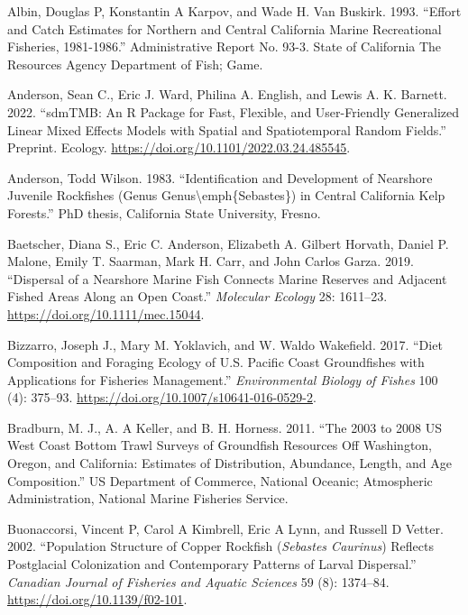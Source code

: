 \documentclass[11pt,
  english,
  letterpaper,
]{article}
\newlength{\cslhangindent}
\newenvironment{CSLReferences}[2] %
 {%
  \setlength{\parindent}{0pt}
  \ifodd #1 \everypar{\setlength{\hangindent}{\cslhangindent}}\ignorespaces\fi
  \ifnum #2 > 0
  \setlength{\parskip}{#2\baselineskip}
  \fi
 }%
 {}
\begin{document}
\hypertarget{refs}{}
\begin{CSLReferences}{1}{0}
\leavevmode{}%
Albin, Douglas P, Konstantin A Karpov, and Wade H. Van Buskirk. 1993. {``Effort and Catch Estimates for {Northern} and {Central} {California} Marine Recreational Fisheries, 1981-1986.''} Administrative Report No. 93-3. State of California The Resources Agency Department of Fish; Game.

\leavevmode{}%
Anderson, Sean C., Eric J. Ward, Philina A. English, and Lewis A. K. Barnett. 2022. {``{sdmTMB}: An {R} Package for Fast, Flexible, and User-Friendly Generalized Linear Mixed Effects Models with Spatial and Spatiotemporal Random Fields.''} Preprint. Ecology. \url{https://doi.org/10.1101/2022.03.24.485545}.

\leavevmode{}%
Anderson, Todd Wilson. 1983. {``Identification and Development of Nearshore Juvenile Rockfishes (Genus Genus{\textbackslash{}}emph\{{Sebastes}\}) in Central {California} Kelp Forests.''} PhD thesis, California State University, Fresno.

\leavevmode{}%
Baetscher, Diana S., Eric C. Anderson, Elizabeth A. Gilbert Horvath, Daniel P. Malone, Emily T. Saarman, Mark H. Carr, and John Carlos Garza. 2019. {``Dispersal of a Nearshore Marine Fish Connects Marine Reserves and Adjacent Fished Areas Along an Open Coast.''} \emph{Molecular Ecology} 28: 1611--23. \url{https://doi.org/10.1111/mec.15044}.

\leavevmode{}%
Bizzarro, Joseph J., Mary M. Yoklavich, and W. Waldo Wakefield. 2017. {``Diet Composition and Foraging Ecology of {U}.{S}. {Pacific} {Coast} Groundfishes with Applications for Fisheries Management.''} \emph{Environmental Biology of Fishes} 100 (4): 375--93. \url{https://doi.org/10.1007/s10641-016-0529-2}.

\leavevmode{}%
Bradburn, M. J., A. A Keller, and B. H. Horness. 2011. {``The 2003 to 2008 {US} {West} {Coast} Bottom Trawl Surveys of Groundfish Resources Off {Washington}, {Oregon}, and {California}: Estimates of Distribution, Abundance, Length, and Age Composition.''} US Department of Commerce, National Oceanic; Atmospheric Administration, National Marine Fisheries Service.

\leavevmode{}%
Buonaccorsi, Vincent P, Carol A Kimbrell, Eric A Lynn, and Russell D Vetter. 2002. {``Population Structure of Copper Rockfish (\emph{{Sebastes} Caurinus}) Reflects Postglacial Colonization and Contemporary Patterns of Larval Dispersal.''} \emph{Canadian Journal of Fisheries and Aquatic Sciences} 59 (8): 1374--84. \url{https://doi.org/10.1139/f02-101}.


\end{CSLReferences}
\end{document}
